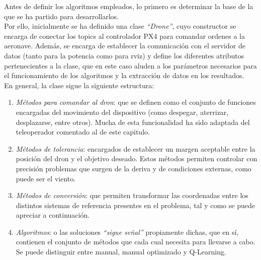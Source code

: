 Antes de definir los algoritmos empleados, lo primero es determinar la base de la que se ha partido para desarrollarlos.\\

Por ello, inicialmente se ha definido una clase \emph{``Drone''}, cuyo constructor se encarga de conectar los topics al controlador PX4 para comandar ordenes a la aeronave. Además, se encarga de establecer la comunicación con el servidor de datos (tanto para la potencia como para rviz) y define los diferentes atributos pertenecientes a la clase, que en este caso aluden a los parámetros necesarios para el funcionamiento de los algoritmos y la extracción de datos en los resultados.\\

En general, la clase sigue la siguiente estructura:

\begin{enumerate}
	\item \emph{Métodos para comandar al dron}: que se definen como el conjunto de funciones encargadas del movimiento del dispositivo (como despegar, aterrizar, desplazarse, entre otros). Mucha de esta funcionalidad ha sido adaptada del teleoperador comentado al de este capitulo.

    \item \emph{Métodos de tolerancia}: encargados de establecer un margen aceptable entre la posición del dron y el objetivo deseado. Estos métodos permiten controlar con precisión problemas que surgen de la deriva y de condiciones externas, como puede ser el viento.

	\item \emph{Métodos de conversión}: que permiten transformar las coordenadas entre los distintos sistemas de referencia presentes en el problema, tal y como se puede apreciar a continuación.

    \item \emph{Algoritmos}: o las soluciones \emph{``sigue señal''} propiamente dichas, que en sí, contienen el conjunto de métodos que cada cual necesita para llevarse a cabo. Se puede distinguir entre manual, manual optimizado y Q-Learning.
\end{enumerate}

